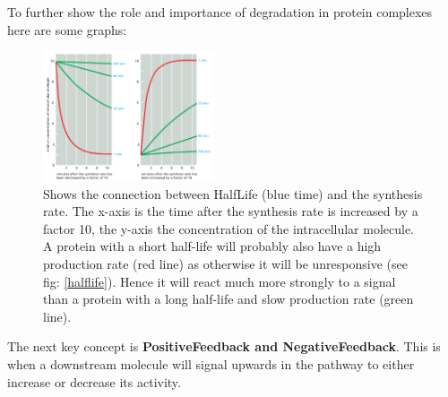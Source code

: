 \documentclass[../main.tex]{subfiles}
\begin{document}
To further show the role and importance of degradation in protein complexes here are some graphs: 
\begin{figure}[H]
	\centering
	\includegraphics[width=0.45\textwidth]{reg_graph}
	\caption{Shows the connection between \gls{HalfLife} (blue time) and the synthesis rate. The x-axis is the time after the synthesis rate is increased by a factor 10, the y-axis the concentration of the intracellular molecule. A protein with a short half-life will probably also have a high production rate (red line) as otherwise it will be unresponsive (see fig: \ref{halflife}). Hence it will react much more strongly to a signal than a protein with a long half-life and slow production rate (green line).}
\end{figure}



The next key concept is \textbf{\gls{PositiveFeedback} and \gls{NegativeFeedback}}. This is when a downstream molecule will signal upwards in the pathway to either increase or decrease its activity.
\begin{figure}[H]
	\centering
	\label{feedback}
\end{figure}
\end{document}

